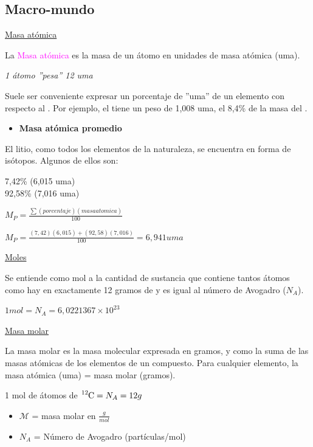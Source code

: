    \subsection{Macro-mundo}
        \begin{center} \underline{Masa atómica} \end{center}
            \indent La \textcolor{magenta}{Masa atómica} es la masa de un átomo en unidades de masa atómica (uma).
            \begin{center} \textit{1 átomo  ''pesa'' 12 uma} \end{center}
            \indent Suele ser conveniente expresar un porcentaje de ''uma'' de un elemento con respecto al . Por ejemplo, el  tiene un peso de 1,008 uma, el 8,4\% de la masa del .
            \begin{itemize} \item \textbf{Masa atómica promedio} \end{itemize}
            \indent El litio, como todos los elementos de la naturaleza, se encuentra en forma de isótopos. Algunos de ellos son: \begin{center} 7,42\%  (6,015 uma) \\ 92,58\%  (7,016 uma) \end{center}
            \begin{center} $M_P = \frac{\sum{(porcentaje)(masa atomica)}}{100}$ \end{center}
            \begin{center} $M_P = \frac{(7,42)(6,015) + (92,58)(7,016)}{100} = 6,941 uma$ \end{center}

        \begin{center} \underline{Moles} \end{center}
        \indent Se entiende como mol a la cantidad de sustancia que contiene tantos átomos como hay en exactamente 12 gramos de  y es igual al número de Avogadro ($N_A$). \\[10pt]
            \begin{center} $1 mol = N_A = 6,0221367 \times 10^{23}$ \end{center}

        \begin{center} \underline{Masa molar} \end{center}
            \indent La masa molar es la masa molecular expresada en gramos, y como la suma de las masas atómicas de los elementos de un compuesto. Para cualquier elemento, la masa atómica (uma) = masa molar (gramos).
            \begin{center} 1 mol de átomos de $\ce{^{12}_{}C} = N_A = 12g$ \end{center}
            \begin{itemize}
                \item $\mathcal{M}$ = masa molar en $\frac{g}{mol}$ 
                \item $N_A$ = Número de Avogadro (partículas/mol)
            \end{itemize}

